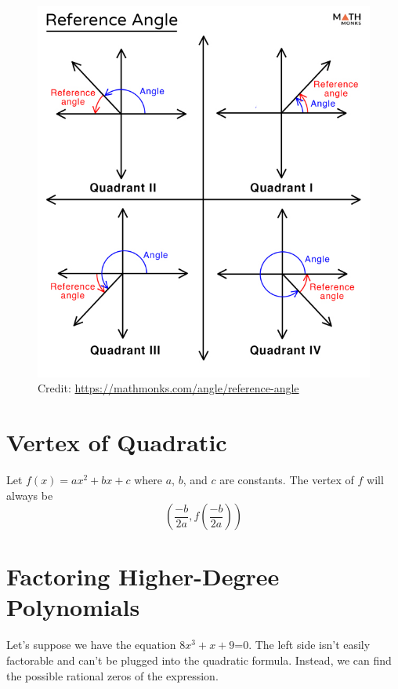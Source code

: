 \documentclass[12pt]{article}
\begin{document}
\begin{figure}[ht]
	\centering
	\includegraphics[scale=0.25]{Reference-Angle}
	\caption{Credit: \url{https://mathmonks.com/angle/reference-angle}}
\end{figure}

\section{Vertex of Quadratic}

Let \(f(x)=ax^2+bx+c\) where \(a\), \(b\), and \(c\) are constants. The vertex of \(f\) will always be\\

\[\left(\frac{-b}{2a}, f\left(\frac{-b}{2a}\right)\right)\]

\section{Factoring Higher-Degree Polynomials}

Let's suppose we have the equation \(8x^3+x+9\)=0. The left side isn't easily factorable and can't be plugged into the quadratic formula. Instead, we can find the possible rational zeros of the expression.\\
\end{document}
